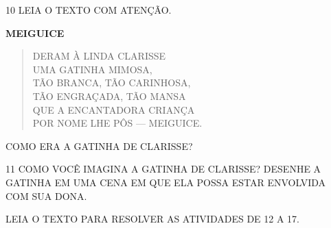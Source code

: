 

\num{10} LEIA O TEXTO COM ATENÇÃO.

\begin{myquote}
\textbf{MEIGUICE}\\
\begin{verse}
DERAM À LINDA CLARISSE\\
UMA GATINHA MIMOSA,\\
TÃO BRANCA, TÃO CARINHOSA,\\
TÃO ENGRAÇADA, TÃO MANSA\\
QUE A ENCANTADORA CRIANÇA\\
POR NOME LHE PÔS --- MEIGUICE.
\end{verse}

\end{myquote}

COMO ERA A GATINHA DE CLARISSE?


\num{11} COMO VOCÊ IMAGINA A GATINHA DE CLARISSE? DESENHE A GATINHA EM UMA CENA EM QUE ELA POSSA ESTAR ENVOLVIDA COM SUA DONA.

\begin{mdframed}[linewidth=2pt,linecolor=salmao,roundcorner=2pt]
\vspace{19cm}
\end{mdframed}

LEIA O TEXTO PARA RESOLVER AS ATIVIDADES DE 12 A 17.

